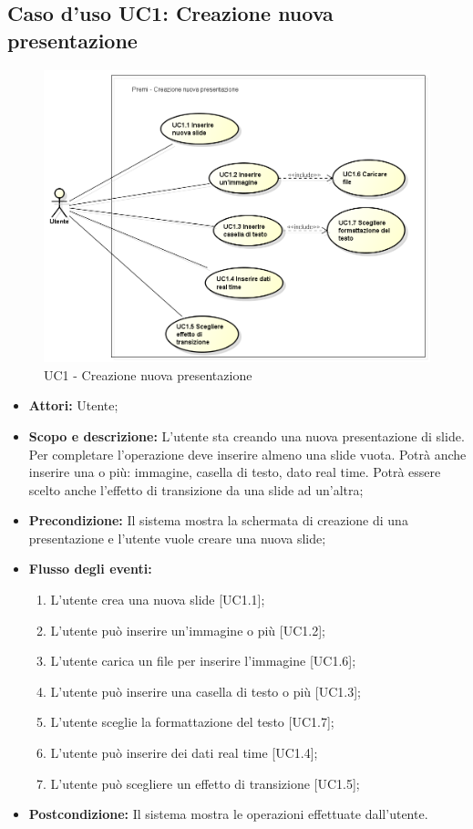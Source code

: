 \subsection{Caso d'uso UC1: Creazione nuova presentazione}
\begin{figure}[h] 
	\centering 
	\includegraphics[scale=0.45] {img/UC1.png} 
	\caption{UC1 - Creazione nuova presentazione} 
\end{figure}

\begin{itemize}
	\item \textbf{Attori:} Utente;
	\item \textbf{Scopo e descrizione:} L'utente sta creando una nuova presentazione di slide. Per completare l'operazione deve inserire almeno una slide vuota. Potrà anche inserire una o più: immagine, casella di testo, dato \gls{real time}. Potrà essere scelto anche l'effetto di transizione da una slide ad un'altra;
	\item \textbf{Precondizione:} Il sistema mostra la schermata di creazione di una presentazione e l'utente vuole creare una nuova slide;
	\item \textbf{Flusso degli eventi:}
	\begin{enumerate}
		\item L'utente crea una nuova slide [UC1.1];
		\item L'utente può inserire un'immagine o più [UC1.2];
		\item L'utente carica un file per inserire l'immagine [UC1.6];
		\item L'utente può inserire una casella di testo o più [UC1.3];
		\item L'utente sceglie la formattazione del testo [UC1.7];
		\item L'utente può inserire dei dati \gls{real time} [UC1.4];
		\item L'utente può scegliere un effetto di transizione [UC1.5];
	\end{enumerate}
	\item \textbf{Postcondizione:} Il sistema mostra le operazioni effettuate dall'utente.
\end{itemize}

